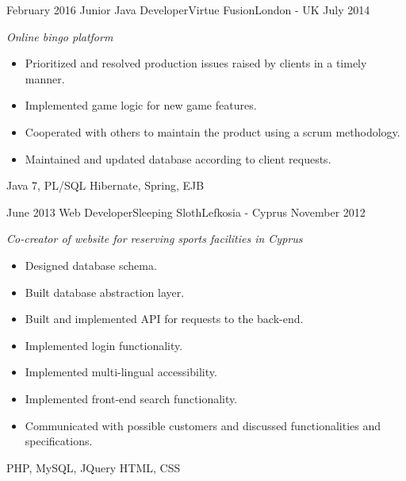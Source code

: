\begin{experiences}
    \experience
      {February 2016}
      {Junior Java Developer}{Virtue Fusion}{London - UK}
      {July 2014}
      {
        \emph{Online bingo platform}
        \begin{itemize}
          \item Prioritized and resolved production issues raised by clients in a timely manner.
          \item Implemented game logic for new game features.
          \item Cooperated with others to maintain the product using a scrum methodology.
          \item Maintained and updated database according to client requests.
        \end{itemize}
      }
      {Java 7, PL/SQL}
      {Hibernate, Spring, EJB}
    \emptySeparator

    \experience
      {June 2013}
      {Web Developer}{Sleeping Sloth}{Lefkosia - Cyprus}
      {November 2012}
      {
        \emph{Co-creator of website for reserving sports facilities in Cyprus}
        \begin{itemize}
          \item Designed database schema.
          \item Built database abstraction layer.
          \item Built and implemented API for requests to the back-end.
          \item Implemented login functionality.
          \item Implemented multi-lingual accessibility.
          \item Implemented front-end search functionality.
          \item Communicated with possible customers and discussed functionalities and specifications.
        \end{itemize}
      }
      {PHP, MySQL, JQuery}
      {HTML, CSS}
  \end{experiences}
